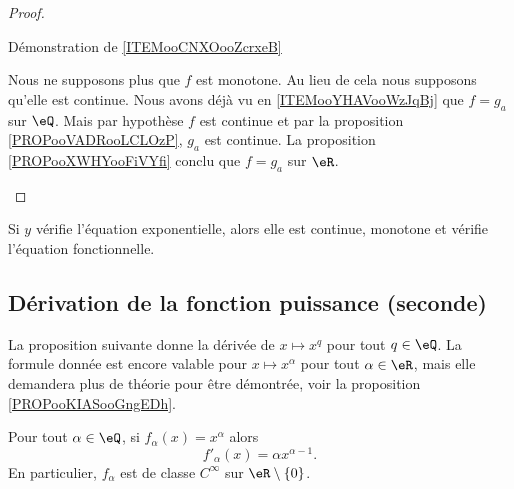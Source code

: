 \begin{proof}
\begin{subproof}
        \item[Démonstration de \ref{ITEMooCNXOooZcrxeB}]

            Nous ne supposons plus que \( f\) est monotone. Au lieu de cela nous supposons qu'elle est continue. Nous avons déjà vu en \ref{ITEMooYHAVooWzJqBj} que \( f=g_a\) sur \( \eQ\). Mais par hypothèse \( f\) est continue et par la proposition \ref{PROPooVADRooLCLOzP}, \( g_a\) est continue. La proposition \ref{PROPooXWHYooFiVYfi} conclu que \( f=g_a\) sur \( \eR\).
    \end{subproof}
\end{proof}

\begin{proposition}
    Si \( y\) vérifie l'équation exponentielle, alors elle est continue, monotone et vérifie l'équation fonctionnelle.
\end{proposition}

\subsection{Dérivation de la fonction puissance (seconde)}

La proposition suivante donne la dérivée de \( x\mapsto x^q\) pour tout \( q\in \eQ\). La formule donnée est encore valable pour \( x\mapsto x^{\alpha}\) pour tout \( \alpha\in \eR\), mais elle demandera plus de théorie pour être démontrée, voir la proposition \ref{PROPooKIASooGngEDh}.
\begin{proposition}     \label{PROPooSGLGooIgzque}
    Pour tout \( \alpha\in \eQ\), si \( f_{\alpha}(x)=x^{\alpha}\) alors
    \begin{equation}
        f'_{\alpha}(x)=\alpha x^{\alpha-1}.
    \end{equation}
    En particulier, \( f_{\alpha}\) est de classe \(  C^{\infty}\) sur \( \eR\setminus\{ 0 \}\).
\end{proposition}

